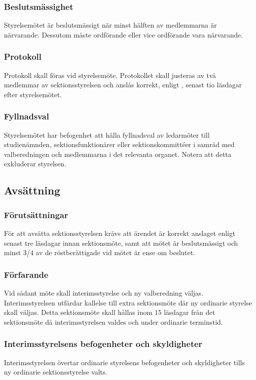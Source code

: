 \subsubsection{Beslutsmässighet}
Styrelsemötet är beslutsmässigt när minst hälften av medlemmarna är närvarande. Dessutom måste ordförande eller vice ordförande vara närvarande.

\subsubsection{Protokoll}
Protokoll skall föras vid styrelsemöte. Protokollet skall justeras av två medlemmar av sektionsstyrelsen och anslås korrekt, enligt , senast tio läsdagar efter styrelsemötet.

\subsubsection{Fyllnadsval}
Styrelsemötet har befogenhet att hålla fyllnadsval av ledarmöter till studienämnden, sektionsfunktionärer eller sektionskommittéer i samråd med valberedningen och medlemmarna i det relevanta organet. Notera att detta exkluderar styrelsen.

\subsection{Avsättning}

\subsubsection{Förutsättningar}
För att avsätta sektionsstyrelsen krävs att ärendet är korrekt anslaget enligt  senast tre läsdagar innan sektionsmöte, samt att mötet är beslutsmässigt och minst 3/4 av de röstberättigade vid mötet är ense om beslutet. 

\subsubsection{Förfarande}
Vid sådant möte skall interimsstyrelse och ny valberedning väljas. Interimsstyrelsen utfärdar kallelse till extra sektionsmöte där ny ordinarie styrelse skall väljas. Detta sektionsmöte skall hållas inom 15 läsdagar från det sektionsmöte då interimsstyrelsen valdes och under ordinarie terminstid.

\subsubsection{Interimsstyrelsens befogenheter och skyldigheter}
Interimsstyrelsen övertar ordinarie styrelsens befogenheter och skyldigheter tills ny ordinarie sektionsstyrelse valts.


